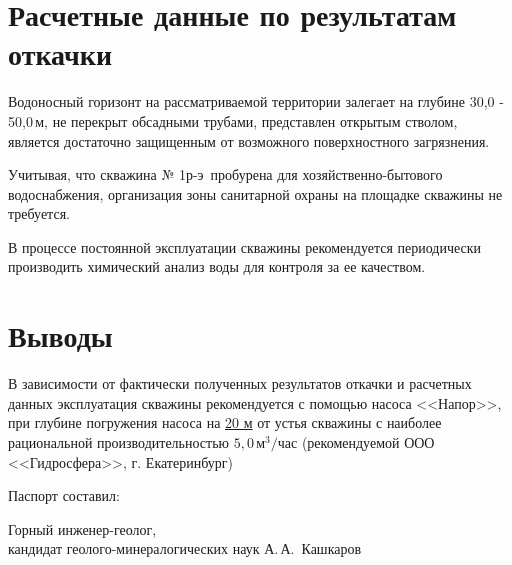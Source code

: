 \documentclass[a4paper,12pt]{article} %
\newcommand{\txtExecutor}{ООО <<Гидросфера>>}			%
\newcommand{\txtNumber}{№ 1р-э}  					%
\newcommand{\txtPump}{<<Напор>>}  					%
\newcommand{\txtDepth}{50,0}						%
\newcommand{\txtDebit}{5,0}							%
\begin{document}
\bigskip




\section*{Расчетные данные по результатам откачки}

Водоносный горизонт на рассматриваемой территории залегает на глубине 	30,0 - \txtDepth	\,м, не перекрыт обсадными трубами, представлен открытым стволом, является достаточно защищенным от возможного поверхностного загрязнения.

Учитывая, что скважина \txtNumber \, пробурена для хозяйственно-бытового водоснабжения, организация зоны санитарной охраны на площадке скважины не требуется.

В процессе постоянной эксплуатации скважины рекомендуется периодически производить химический анализ воды для контроля за ее качеством.

\section*{Выводы}

В зависимости от фактически полученных результатов откачки и расчетных данных эксплуатация скважины рекомендуется с помощью насоса  \txtPump, при глубине погружения насоса  на \underline{20 м} от устья скважины с наиболее рациональной производительностью 	$\txtDebit \,м^3/час$ (рекомендуемой \txtExecutor, г. Екатеринбург)

\bigskip

Паспорт составил:

\bigskip

\begin{minipage}{1.0\textwidth}
	Горный инженер-геолог,\\
	кандидат геолого-минералогических наук 
	А.\,А.~Кашкаров
\end{minipage}
\end{document}
